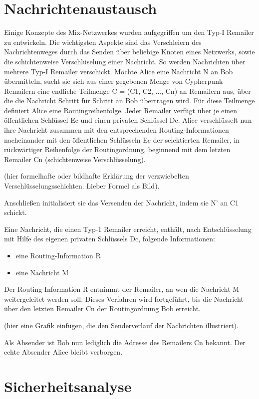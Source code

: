 \section{Nachrichtenaustausch}
Einige Konzepte des Mix-Netzwerkes wurden aufgegriffen um den Typ-I Remailer zu entwickeln. Die wichtigsten Aspekte sind das Verschleiern des Nachrichtenweges durch das Senden über beliebige Knoten eines Netzwerks, sowie die schichtenweise Verschlüselung einer Nachricht. So werden Nachrichten über mehrere Typ-I Remailer verschickt. Möchte Alice eine Nachricht N an Bob übermitteln, sucht sie sich aus einer gegebenen Menge von Cypherpunk-Remailern eine endliche Teilmenge C = (C1, C2, ..., Cn) an Remailern aus, über die die Nachricht Schritt für Schritt an Bob übertragen wird. Für diese Teilmenge definiert Alice eine Routingreihenfolge. Jeder Remailer verfügt über je einen öffentlichen Schlüssel Ec und einen privaten Schlüssel Dc.
Alice verschlüsselt nun ihre Nachricht zusammen mit den entsprechenden Routing-Informationen nacheinander mit den öffentlichen Schlüsseln Ec der selektierten Remailer, in rückwärtiger Reihenfolge der Routingordnung, beginnend mit dem letzten Remailer Cn (schichtenweise Verschlüsselung).

(hier formelhafte oder bildhafte Erklärung der verzwiebelten Verschlüsselungsschichten. Lieber Formel als Bild).

Anschließen initialisiert sie das Versenden der Nachricht, indem sie N' an C1 schickt.

Eine Nachricht, die einen Typ-1 Remailer erreicht, enthält, nach Entschlüsselung mit Hilfe des eigenen privaten Schlüssels Dc, folgende Informationen:
\begin{itemize}
\item eine Routing-Information R
\item eine Nachricht M
\end{itemize}

Der Routing-Information R entnimmt der Remailer, an wen die Nachricht M weitergeleitet werden soll. Dieses Verfahren wird fortgeführt, bis die Nachricht über den letzten Remailer Cn der Routingordnung Bob erreicht.

(hier eine Grafik einfügen, die den  Senderverlauf der Nachrichten illustriert).

Als Absender ist Bob nun lediglich die Adresse des Remailers Cn bekannt. Der echte Absender Alice bleibt verborgen.




\section{Sicherheitsanalyse}
